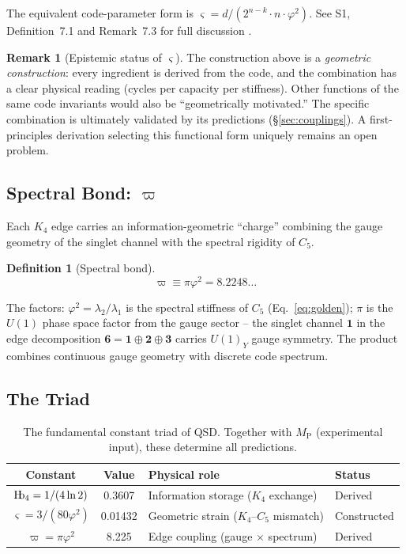 \documentclass[11pt,a4paper]{article}
\theoremstyle{definition}
\newtheorem{definition}[theorem]{Definition}
\newtheorem{remark}[theorem]{Remark}
\newcommand{\Hb}{\textnormal{H\kern-0.3em b}}
\newcommand{\Hbfour}{\Hb_4}
\newcommand{\strain}{\varsigma}
\newcommand{\specbond}{\varpi}
\newcommand{\Mpl}{M_{\mathrm{P}}}
\begin{document}
The equivalent code-parameter form is $\strain = d/(2^{n-k} \cdot n \cdot \varphi^2)$. See S1, Definition~7.1 and Remark~7.3 for full discussion \cite{Hubka2026QSDsupp}.

\begin{remark}[Epistemic status of $\strain$]
\label{rem:strain_status}
The construction above is a \emph{geometric construction}: every ingredient is derived from the code, and the combination has a clear physical reading (cycles per capacity per stiffness). Other functions of the same code invariants would also be ``geometrically motivated.'' The specific combination is ultimately validated by its predictions (\S\ref{sec:couplings}). A first-principles derivation selecting this functional form uniquely remains an open problem.
\end{remark}

\subsection{Spectral Bond: $\specbond$}

Each $K_4$ edge carries an information-geometric ``charge'' combining the gauge geometry of the singlet channel with the spectral rigidity of $C_5$.

\begin{definition}[Spectral bond]
\label{def:specbond}
\begin{equation}
\boxed{\specbond \equiv \pi \varphi^2 = 8.2248\ldots}
\label{eq:specbond}
\end{equation}
\end{definition}

The factors: $\varphi^2 = \lambda_2/\lambda_1$ is the spectral stiffness of $C_5$ (Eq.~\ref{eq:golden}); $\pi$ is the $U(1)$ phase space factor from the gauge sector -- the singlet channel $\mathbf{1}$ in the edge decomposition $\mathbf{6} = \mathbf{1} \oplus \mathbf{2} \oplus \mathbf{3}$ carries $U(1)_Y$ gauge symmetry. The product combines continuous gauge geometry with discrete code spectrum.

\subsection{The Triad}

\begin{table}[h]
\centering
\begin{tabular}{ccll}
\toprule
\textbf{Constant} & \textbf{Value} & \textbf{Physical role} & \textbf{Status} \\
\midrule
$\Hbfour = 1/(4\ln 2)$ & 0.3607 & Information storage ($K_4$ exchange) & Derived \\
$\strain = 3/(80\varphi^2)$ & 0.01432 & Geometric strain ($K_4$--$C_5$ mismatch) & Constructed \\
$\specbond = \pi\varphi^2$ & 8.225 & Edge coupling (gauge $\times$ spectrum) & Derived \\
\bottomrule
\end{tabular}
\caption{The fundamental constant triad of QSD. Together with $\Mpl$ (experimental input), these determine all predictions.}
\label{tab:triad}
\end{table}
\end{document}
